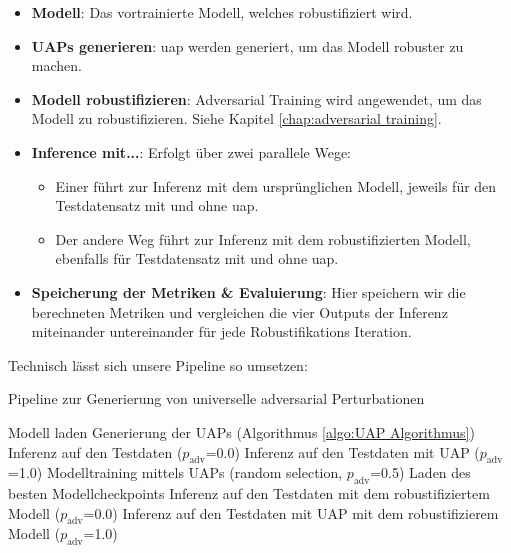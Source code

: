 \begin{itemize}
    \item \textbf{Modell}: Das vortrainierte Modell, welches robustifiziert wird.
    \item \textbf{UAPs generieren}: \acrshort{uap} werden generiert, um das Modell robuster zu machen.
    \item \textbf{Modell robustifizieren}: Adversarial Training wird angewendet, um das Modell zu robustifizieren. Siehe Kapitel \ref{chap:adversarial training}.
    \item \textbf{Inference mit...}: Erfolgt über zwei parallele Wege:
        \begin{itemize}
            \item Einer führt zur Inferenz mit dem ursprünglichen Modell, jeweils für den Testdatensatz mit und ohne \acrshort{uap}.
            \item Der andere Weg führt zur Inferenz mit dem robustifizierten Modell, ebenfalls für Testdatensatz mit und ohne \acrshort{uap}.
        \end{itemize}
    \item \textbf{Speicherung der Metriken \& Evaluierung}: Hier speichern wir die berechneten Metriken und vergleichen die vier Outputs der Inferenz miteinander untereinander für jede Robustifikations Iteration. 
\end{itemize}

\newpage

Technisch lässt sich unsere Pipeline so umsetzen:

\begin{algorithm}
\caption{Pipeline zur Generierung von universelle adversarial Perturbationen}
\label{alg:UAP_Pseudo_Algorithmmus}
\begin{algorithmic}[1]
\STATE Modell laden
    \STATE Generierung der UAPs (Algorithmus \ref{algo:UAP Algorithmus})
    \STATE Inferenz auf den Testdaten ($p_{\text{adv}}$=0.0)
        \STATE Inferenz auf den Testdaten mit UAP ($p_{\text{adv}}$=1.0)
    \ENDFOR
    \STATE Modelltraining mittels UAPs (random selection, $p_{\text{adv}}$=0.5)
    \STATE Laden des besten Modellcheckpoints
    \STATE Inferenz auf den Testdaten mit dem robustifiziertem Modell ($p_{\text{adv}}$=0.0)
        \STATE Inferenz auf den Testdaten mit UAP mit dem robustifizierem Modell ($p_{\text{adv}}$=1.0)
    \ENDFOR
\ENDFOR
\end{algorithmic}
\end{algorithm}

